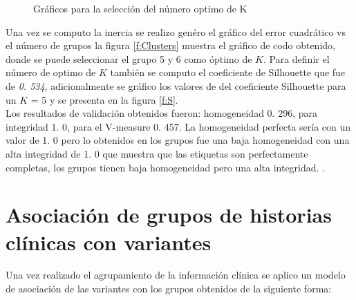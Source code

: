 \begin{figure}[H]
	\centering
	\caption{Gráficos para la selección del número optimo de K}
	\label{f:medidas}
\end{figure}


Una vez se computo la inercia se realizo genéro el gráfico del error cuadrático vs el número de grupos  la figura \ref{f:Clusters} muestra el gráfico de codo obtenido, donde se puede seleccionar el grupo 5 y 6 como óptimo de $K$. Para definir el número de optimo de $K$ también se computo el coeficiente de Silhouette  que fue de \textit{0. 534}, adicionalmente se gráfico los valores de del coeficiente Silhouette para un $K$ = 5 y se presenta en la figura \ref{f:S}. \\

Los resultados de validación obtenidos fueron: homogeneidad 0. 296, para integridad 1. 0, para el V-measure 0. 457. La homogeneidad perfecta sería con un valor de 1. 0 pero lo obtenidos en los grupos fue una baja homogeneidad con una alta  integridad de 1. 0 que muestra que las etiquetas son perfectamente completas, los grupos tienen  baja homogeneidad pero una alta integridad. \cite{scikit-learn}. 


\section{Asociación de grupos de historias clínicas con variantes}

Una vez realizado el agrupamiento de la información clínica se aplico un modelo de asociación de las variantes con los grupos obtenidos de la siguiente forma:

